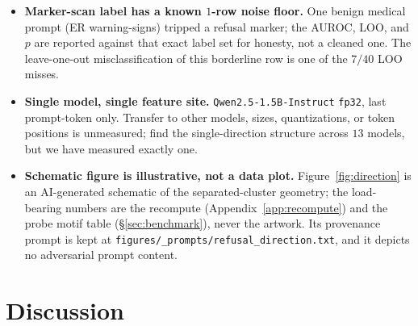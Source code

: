 \documentclass[11pt,a4paper]{article}
\begin{document}
\begin{itemize}
    what we explicitly do \emph{not} claim here. A causal single-direction
    ablation on our surface (plus the SAE decomposition above) is the open
    \textbf{M5.SAFETY residual (2)}; it is GPU-bound and out of scope of this
    recompute-verifiable contribution. This caveat is the most important one in
    the paper.
  \item \textbf{Marker-scan label has a known \(1\)-row noise floor.} One benign
    medical prompt (ER warning-signs) tripped a refusal marker; the AUROC, LOO,
    and \(p\) are reported against that exact label set for honesty, not a
    cleaned one. The leave-one-out misclassification of this borderline row is
    one of the \(7/40\) LOO misses.
  \item \textbf{Single model, single feature site.} \texttt{Qwen2.5-1.5B-Instruct}
    \texttt{fp32}, last prompt-token only. Transfer to other models, sizes,
    quantizations, or token positions is unmeasured; \citet{arditi2024refusal}
    find the single-direction structure across \(13\) models, but we have
    measured exactly one.
  \item \textbf{Schematic figure is illustrative, not a data plot.}
    Figure~\ref{fig:direction} is an AI-generated schematic of the
    separated-cluster geometry; the load-bearing numbers are the recompute
    (Appendix~\ref{app:recompute}) and the probe motif table
    (\S\ref{sec:benchmark}), never the artwork. Its provenance prompt is kept at
    \texttt{figures/\_prompts/refusal\_direction.txt}, and it depicts no
    adversarial prompt content.
\end{itemize}

\section{Discussion}
\label{sec:discussion}
\end{document}
